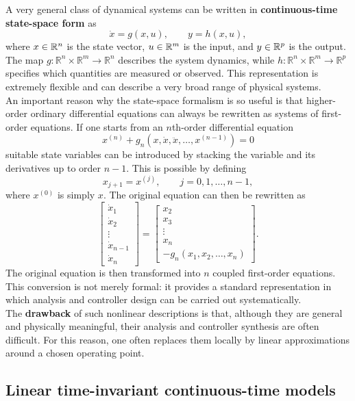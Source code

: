 A very general class of dynamical systems can be written in \textbf{continuous-time state-space form} as
\[
\dot{x} = g(x,u), \qquad y = h(x,u),
\]
where $x \in \mathbb{R}^n$ is the state vector, $u \in \mathbb{R}^m$ is the input, and $y \in \mathbb{R}^p$ is the output. The map $g :\mathbb{R}^n \times \mathbb{R}^m \rightarrow \mathbb{R}^n$ describes the system dynamics, while $h :\mathbb{R}^n \times \mathbb{R}^m \rightarrow \mathbb{R}^p$ specifies which quantities are measured or observed. This representation is extremely flexible and can describe a very broad range of physical systems.\\
An important reason why the state-space formalism is so useful is that higher-order ordinary differential equations can always be rewritten as systems of first-order equations. If one starts from an $n$th-order differential equation
$$ x^{(n)} + g_n(x,\dot{x},\ddot{x},\dots,x^{(n-1)}) = 0 $$suitable state variables can be introduced by stacking the variable and its derivatives up to order $n-1$. This is possible by defining
$$x_{j+1} = x^{(j)}, \qquad j=0,1,\dots,n-1,$$
where $x^{(0)}$ is simply $x$. The original equation can then be rewritten as
\[\begin{bmatrix}\dot{x}_1\\ \dot{x}_2\\ \vdots \\ \dot{x}_{n-1}\\ \dot{x}_n\end{bmatrix} = \begin{bmatrix} x_2 \\ x_3 \\ \vdots \\ x_n \\ -g_n(x_1,x_2,\dots,x_n) \end{bmatrix}.\]
The original equation is then transformed into $n$ coupled first-order equations. This conversion is not merely formal: it provides a standard representation in which analysis and controller design can be carried out systematically.\\

The \textbf{drawback} of such nonlinear descriptions is that, although they are general and physically meaningful, their analysis and controller synthesis are often difficult. For this reason, one often replaces them locally by linear approximations around a chosen operating point.

\subsection{Linear time-invariant continuous-time models}

